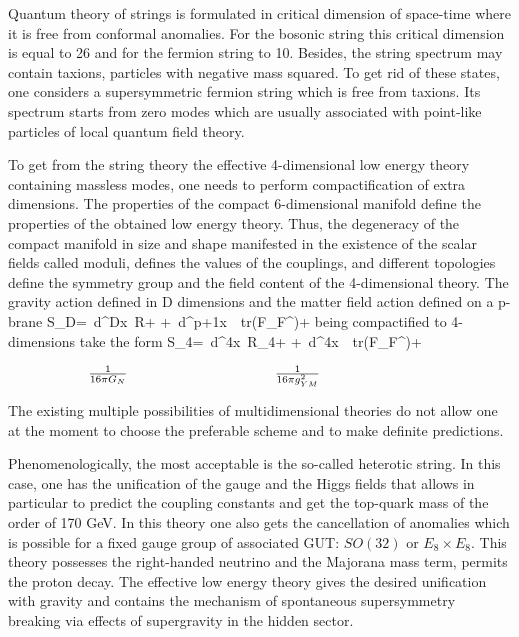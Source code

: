 \documentclass{cernyrep}
\begin{document}
Quantum theory of strings is formulated in critical dimension of space-time  where it is free from conformal anomalies. For the bosonic string this critical dimension is equal to 26 and for the fermion string to 10. Besides, the string spectrum may contain taxions, particles with negative mass squared. To get rid of these states, one considers a supersymmetric  fermion string which is free from taxions. Its spectrum starts from zero modes which are usually associated with point-like particles of local quantum field theory. 

To get from the string theory the effective 4-dimensional low energy theory containing massless modes, one needs to perform compactification of extra dimensions. The properties of the compact 6-dimensional manifold define the properties of the obtained low energy theory. Thus, the degeneracy of the compact manifold in size and shape manifested in the existence of the scalar fields called moduli, defines the values of the couplings, and different topologies define the symmetry group and the field content of the 4-dimensional theory. The gravity action defined in D dimensions
and the matter field action defined on a p-brane
\beq
S_D=\int\ d^Dx\ R+ \cdots+\int\ d^{p+1}x\ \sqrt{-\gamma}\ tr(F_{\alpha\beta}F^{\alpha\beta})+\cdots
\eeq
being compactified to 4-dimensions take the form
\beq
S_4=\int\ d^4x\ R_4+ \cdots+\int\ d^{4}x\ \ tr(F_{\mu\nu}F^{\mu\nu})+\cdots 
\eeq\vspace{-0.6cm}

$ \hspace{2.0cm} \frac{1}{16\pi G_N} \hspace{3.7cm}\frac{1}{16\pi g_{YM}^2} $\vspace{0.5cm}

The existing multiple possibilities of multidimensional theories do not allow one at the moment to  choose the preferable scheme and to make definite predictions.

Phenomenologically, the most acceptable is the so-called heterotic string.  In this case, one has the unification of the gauge and the Higgs fields that allows in particular to predict the coupling constants and get the top-quark mass of the order of 170 GeV. In this theory one also gets the cancellation of anomalies  which is possible for a fixed gauge group of associated GUT: $SO(32)$ or $E_8\times E_8$. This theory possesses the right-handed neutrino and the Majorana mass term,
permits the proton decay. The effective low energy theory gives the desired unification with gravity and contains the mechanism of spontaneous supersymmetry breaking  via effects of supergravity
in the hidden sector.
\end{document}
